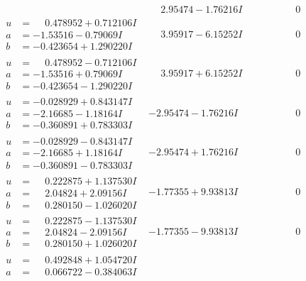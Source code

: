 \documentclass[1p]{elsarticle_modified}
\theoremstyle{definition}
\begin{document}
$$\begin{array}{c|c|c}
 & \phantom{-}2.95474 - 1.76216 I & \phantom{-0.000000 } 0 \\ \hline\begin{aligned}
u &= \phantom{-}0.478952 + 0.712106 I \\
a &= -1.53516 - 0.79069 I \\
b &= -0.423654 + 1.290220 I\end{aligned}
 & \phantom{-}3.95917 - 6.15252 I & \phantom{-0.000000 } 0 \\ \hline\begin{aligned}
u &= \phantom{-}0.478952 - 0.712106 I \\
a &= -1.53516 + 0.79069 I \\
b &= -0.423654 - 1.290220 I\end{aligned}
 & \phantom{-}3.95917 + 6.15252 I & \phantom{-0.000000 } 0 \\ \hline\begin{aligned}
u &= -0.028929 + 0.843147 I \\
a &= -2.16685 - 1.18164 I \\
b &= -0.360891 + 0.783303 I\end{aligned}
 & -2.95474 - 1.76216 I & \phantom{-0.000000 } 0 \\ \hline\begin{aligned}
u &= -0.028929 - 0.843147 I \\
a &= -2.16685 + 1.18164 I \\
b &= -0.360891 - 0.783303 I\end{aligned}
 & -2.95474 + 1.76216 I & \phantom{-0.000000 } 0 \\ \hline\begin{aligned}
u &= \phantom{-}0.222875 + 1.137530 I \\
a &= \phantom{-}2.04824 + 2.09156 I \\
b &= \phantom{-}0.280150 - 1.026020 I\end{aligned}
 & -1.77355 + 9.93813 I & \phantom{-0.000000 } 0 \\ \hline\begin{aligned}
u &= \phantom{-}0.222875 - 1.137530 I \\
a &= \phantom{-}2.04824 - 2.09156 I \\
b &= \phantom{-}0.280150 + 1.026020 I\end{aligned}
 & -1.77355 - 9.93813 I & \phantom{-0.000000 } 0 \\ \hline\begin{aligned}
u &= \phantom{-}0.492848 + 1.054720 I \\
a &= \phantom{-}0.066722 - 0.384063 I \\

\end{aligned}
\end{array}$$
\end{document}
